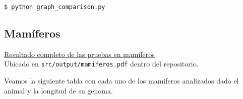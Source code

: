 \documentclass[12pt]{article}
\begin{document}
\begin{center}
  \texttt{\$ python graph\_comparison.py}
\end{center}

\newpage
\subsection{Mamíferos}

\begin{center}
  \href{https://gitlab.com/pppkizbroutle/proyecto-genomica/-/raw/master/src/output/mamiferos.pdf?inline=false}{Resultado completo de las pruebas en mamíferos}\\
  Ubicado en \texttt{src/output/mamiferos.pdf} dentro del repositorio.
\end{center}

\noindent Veamos la siguiente tabla con cada uno de los mamíferos analizados dado el animal y la longitud de su genoma.
\end{document}

